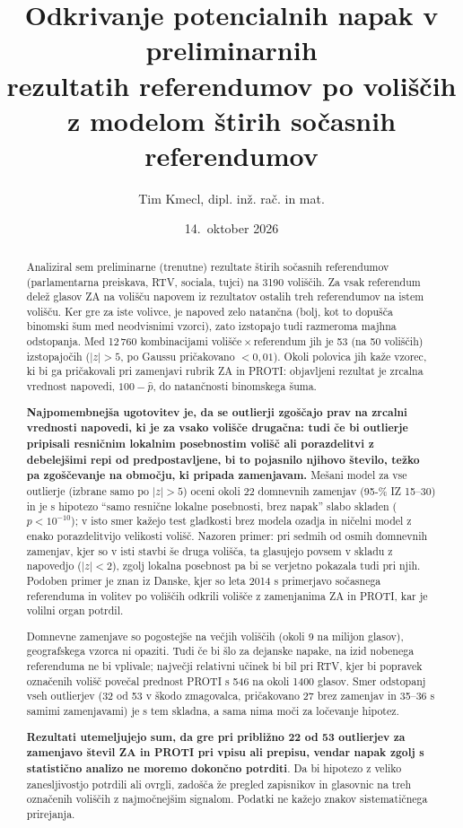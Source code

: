 \documentclass[11pt,a4paper]{article}
\title{Odkrivanje potencialnih napak v preliminarnih\\rezultatih referendumov po voliščih\\z modelom štirih sočasnih referendumov}
\author{Tim Kmecl, dipl. inž. rač. in mat.}
\date{14.~oktober 2026}
\begin{document}
\maketitle

\begin{abstract}
\setlength{\parindent}{0pt}\setlength{\parskip}{0.5em}
\noindent Analiziral sem preliminarne (trenutne) rezultate štirih sočasnih referendumov (parlamentarna preiskava, RTV, sociala, tujci) na 3190 voliščih. Za vsak referendum delež glasov ZA na volišču napovem iz rezultatov ostalih treh referendumov na istem volišču. Ker gre za iste volivce, je napoved zelo natančna (bolj, kot to dopušča binomski šum med neodvisnimi vzorci), zato izstopajo tudi razmeroma majhna odstopanja. Med 12\,760 kombinacijami volišče\,$\times$\,referendum jih je 53 (na 50 voliščih) izstopajočih ($|z|>5$, po Gaussu pričakovano $<0{,}01$). Okoli polovica jih kaže vzorec, ki bi ga pričakovali pri zamenjavi rubrik ZA in PROTI: objavljeni rezultat je zrcalna vrednost napovedi, $100-\hat p$, do natančnosti binomskega šuma. 

\textbf{Najpomembnejša ugotovitev je, da se outlierji zgoščajo prav na zrcalni vrednosti napovedi, ki je za vsako volišče drugačna: tudi če bi outlierje pripisali resničnim lokalnim posebnostim volišč ali porazdelitvi z debelejšimi repi od predpostavljene, bi to pojasnilo njihovo število, težko pa zgoščevanje na območju, ki pripada zamenjavam.} Mešani model za vse outlierje (izbrane samo po $|z|>5$) oceni okoli 22 domnevnih zamenjav (95-\% IZ 15--30) in je s hipotezo ``samo resnične lokalne posebnosti, brez napak'' slabo skladen ($p<10^{-10}$); v isto smer kažejo test gladkosti brez modela ozadja in ničelni model z enako porazdelitvijo velikosti volišč. Nazoren primer: pri sedmih od osmih domnevnih zamenjav, kjer so v isti stavbi še druga volišča, ta glasujejo povsem v skladu z napovedjo ($|z|<2$), zgolj lokalna posebnost pa bi se verjetno pokazala tudi pri njih. Podoben primer je znan iz Danske, kjer so leta 2014 s primerjavo sočasnega referenduma in volitev po voliščih odkrili volišče z zamenjanima ZA in PROTI, kar je volilni organ potrdil.

Domnevne zamenjave so pogostejše na večjih voliščih (okoli 9 na milijon glasov), geografskega vzorca ni opaziti. Tudi če bi šlo za dejanske napake, na izid nobenega referenduma ne bi vplivale; največji relativni učinek bi bil pri RTV, kjer bi popravek označenih volišč povečal prednost PROTI s 546 na okoli 1400 glasov. Smer odstopanj vseh outlierjev (32 od 53 v škodo zmagovalca, pričakovano 27 brez zamenjav in 35--36 s samimi zamenjavami) je s tem skladna, a sama nima moči za ločevanje hipotez.

\textbf{Rezultati utemeljujejo sum, da gre pri približno 22 od 53 outlierjev za zamenjavo števil ZA in PROTI pri vpisu ali prepisu, vendar napak zgolj s statistično analizo ne moremo dokončno potrditi}. Da bi hipotezo z veliko zanesljivostjo potrdili ali ovrgli, zadošča že pregled zapisnikov in glasovnic na treh označenih voliščih z najmočnejšim signalom. Podatki ne kažejo znakov sistematičnega prirejanja.
\end{abstract}
\end{document}
